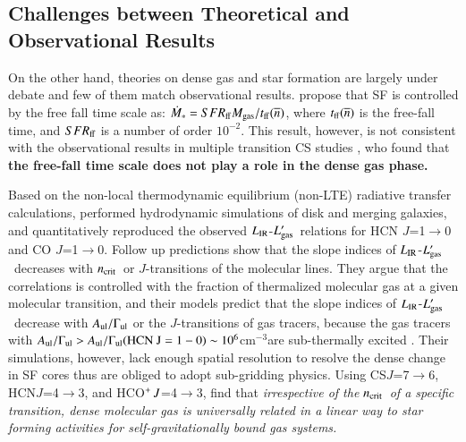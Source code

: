 \documentclass[legal,11pt]{article}
\newcommand{\nbar}{\overline{n}}
\def\cmt   {cm$^{-3}$\,}
\def\,{\thinspace}
\def\to{$\rightarrow$}
\def\ncrit{$n_{\rm crit}$}
\def\LIR     {$L_{\rm IR}$}
\def\LCO     {$L_{\rm CO}$}
\def\Lgas    {$L'_{\rm gas}$}
\def\HCNft        {HCN\,$J$=4$\rightarrow$3}
\def\HCOPft     {HCO$^+\,J$=4$\rightarrow$3}
\def\CSss          {CS\,$J$=7$\rightarrow$6}
\begin{document}


\subsection{Challenges between Theoretical and Observational Results}

On the other hand, theories on dense gas and star formation are largely under
debate and few of them match observational results.  \citet{kt07} propose that
SF is controlled by the free fall time scale as: $\dot{M}_* = SFR_{\rm ff}
M_{\rm gas} / t_{\rm ff}(\nbar)$, where $t_{\rm ff}(\nbar)$ is the free-fall
time, and $SFR_{\rm ff}$ is a number of order $10^{-2}$.  This result, however,
is not consistent with the observational results in multiple transition CS
studies \citep[i.e.,][]{zgh2014}, who found that {\bf the free-fall time scale does
not play a role in the dense gas phase.}


Based on the non-local thermodynamic equilibrium (non-LTE) radiative transfer
calculations, \citet{ncs08} performed hydrodynamic simulations of disk and
merging galaxies, and quantitatively reproduced the observed \LIR-\Lgas\
relations for HCN $J$=1\to0 and CO $J$=1\to0. Follow up predictions show that
the slope indices of \LIR-\Lgas\ decreases with \ncrit\ or $J$-transitions of
the molecular lines. They argue that the correlations is controlled with the
fraction of thermalized molecular gas at a given molecular transition, and
their models predict that the slope indices of \LIR-\Lgas\ decrease with
$A_{\rm ul}/\Gamma_{\rm ul}$ or the $J$-transitions of gas tracers, because the
gas tracers with $A_{\rm ul}/\Gamma_{\rm ul}> A_{\rm ul}/\Gamma_{\rm ul} (\rm
HCN\ J=1-0) \sim 10^6$\cmt are sub-thermally excited \citep[e.g.,][]{kt07, ncs08,
jnm09}. Their simulations, however, lack enough spatial resolution to resolve
the dense change in SF cores thus are obliged to adopt sub-gridding physics.
Using \CSss, \HCNft, and \HCOPft, \cite{zgh2014} find that {\it irrespective
of the \ncrit\ of a specific transition, dense molecular gas is universally
related in a linear way to star forming activities for self-gravitationally
bound gas systems.}
\end{document}
